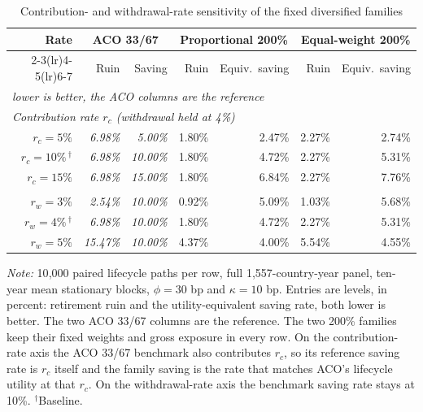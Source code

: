 \begin{table}[H]
\centering
\caption{Contribution- and withdrawal-rate sensitivity of the fixed diversified families}
\label{tab:policy-sensitivity}
\small\setlength{\tabcolsep}{4pt}
\begin{tabular}{rrrrrrr}
\toprule
Rate & \multicolumn{2}{c}{ACO 33/67} & \multicolumn{2}{c}{Proportional 200\%} & \multicolumn{2}{c}{Equal-weight 200\%} \\
\cmidrule(lr){2-3}\cmidrule(lr){4-5}\cmidrule(lr){6-7}
 & Ruin & Saving & Ruin & Equiv.\ saving & Ruin & Equiv.\ saving \\
\multicolumn{7}{l}{\footnotesize\emph{lower is better, the ACO columns are the reference}} \\
\midrule
\multicolumn{7}{l}{\emph{Contribution rate $r_c$ (withdrawal held at 4\%)}} \\
$r_c=5\%$ & \emph{6.98\%} & \emph{5.00\%} & 1.80\% & 2.47\% & 2.27\% & 2.74\% \\
$r_c=10\%$\,$^{\dagger}$ & \emph{6.98\%} & \emph{10.00\%} & 1.80\% & 4.72\% & 2.27\% & 5.31\% \\
$r_c=15\%$ & \emph{6.98\%} & \emph{15.00\%} & 1.80\% & 6.84\% & 2.27\% & 7.76\% \\
\addlinespace
\multicolumn{7}{l}{\emph{Withdrawal rate $r_w$ (contribution held at 10\%)}} \\
$r_w=3\%$ & \emph{2.54\%} & \emph{10.00\%} & 0.92\% & 5.09\% & 1.03\% & 5.68\% \\
$r_w=4\%$\,$^{\dagger}$ & \emph{6.98\%} & \emph{10.00\%} & 1.80\% & 4.72\% & 2.27\% & 5.31\% \\
$r_w=5\%$ & \emph{15.47\%} & \emph{10.00\%} & 4.37\% & 4.00\% & 5.54\% & 4.55\% \\
\bottomrule
\end{tabular}
\begin{minipage}{0.96\textwidth}\footnotesize
\textit{Note:} 10{,}000 paired lifecycle paths per row, full 1{,}557-country-year panel, ten-year mean stationary blocks, $\phi=30$ bp and $\kappa=10$ bp. Entries are levels, in percent: retirement ruin and the utility-equivalent saving rate, both lower is better. The two ACO 33/67 columns are the reference. The two 200\% families keep their fixed weights and gross exposure in every row. On the contribution-rate axis the ACO 33/67 benchmark also contributes $r_c$, so its reference saving rate is $r_c$ itself and the family saving is the rate that matches ACO's lifecycle utility at that $r_c$. On the withdrawal-rate axis the benchmark saving rate stays at 10\%. $^{\dagger}$Baseline.
\end{minipage}
\end{table}
